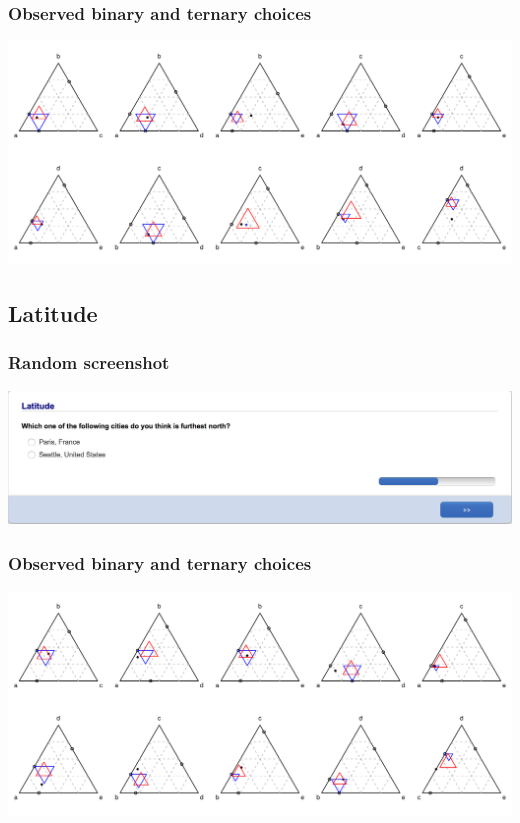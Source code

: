\documentclass[11pt,letter]{article}
\begin{document}
\subsubsection*{Observed binary and ternary choices}

\includegraphics[width=15cm]{./Population_study_data/Simplexes/marijuana.pdf}

\pagebreak

\subsection*{Latitude}



\subsubsection*{Random screenshot}

\includegraphics[width=15cm]{Population_study_design/screenshot_latitude.png}

\subsubsection*{Observed binary and ternary choices}

\includegraphics[width=15cm]{./Population_study_data/Simplexes/latitude.pdf}
\end{document}
